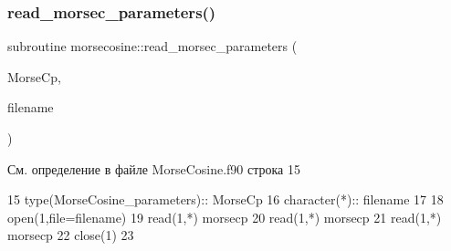 \subsubsection{\texorpdfstring{read\+\_\+morsec\+\_\+parameters()}{read\_morsec\_parameters()}}
{\footnotesize\ttfamily subroutine morsecosine\+::read\+\_\+morsec\+\_\+parameters (\begin{DoxyParamCaption}\item[{type(\mbox{\hyperlink{structmorsecosine_1_1morsecosine__parameters}{morsecosine\+\_\+parameters}})}]{Morse\+Cp,  }\item[{character($\ast$)}]{filename }\end{DoxyParamCaption})}



См. определение в файле Morse\+Cosine.\+f90 строка 15


\begin{DoxyCode}
15     \textcolor{keywordtype}{type}(MorseCosine\_parameters):: MorseCp
16     \textcolor{keywordtype}{character(*)}::  filename
17     
18     \textcolor{keyword}{open}(1,file=filename)
19     \textcolor{keyword}{read}(1,*) morsecp%
20     \textcolor{keyword}{read}(1,*) morsecp%
21     \textcolor{keyword}{read}(1,*) morsecp%
22     \textcolor{keyword}{close}(1)
23     
\end{DoxyCode}
